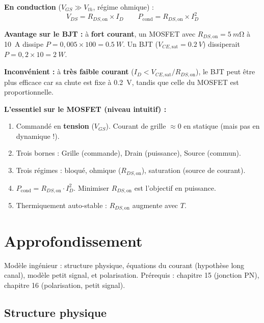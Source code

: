 \documentclass[12pt,a4paper,twoside]{book}
\begin{document}
\begin{formule}
\textbf{En conduction} ($V_{GS} \gg V_{th}$, régime ohmique) :
\[
\boxed{V_{DS} = R_{DS,\text{on}} \times I_D} \qquad \boxed{P_{\text{cond}} = R_{DS,\text{on}} \times I_D^2}
\]

\textbf{Avantage sur le BJT :} à \textbf{fort courant}, un MOSFET avec $R_{DS,\text{on}} = \SI{5}{m\ohm}$ à \SI{10}{A} dissipe $P = 0{,}005\times100 = \SI{0.5}{W}$. Un BJT ($V_{CE,\text{sat}} = \SI{0.2}{V}$) dissiperait $P = 0{,}2\times10 = \SI{2}{W}$.

\textbf{Inconvénient :} à \textbf{très faible courant} ($I_D < V_{CE,\text{sat}}/R_{DS,\text{on}}$), le BJT peut être plus efficace car sa chute est fixe à \SI{0.2}{V}, tandis que celle du MOSFET est proportionnelle.
\end{formule}

\begin{retenir}
\textbf{L'essentiel sur le MOSFET (niveau intuitif) :}
\begin{enumerate}[nosep]
\item Commandé en \textbf{tension} ($V_{GS}$). Courant de grille $\approx 0$ en statique (mais pas en dynamique !).
\item Trois bornes : Grille (commande), Drain (puissance), Source (commun).
\item Trois régimes : bloqué, ohmique ($R_{DS,\text{on}}$), saturation (source de courant).
\item $P_{\text{cond}} = R_{DS,\text{on}} \cdot I_D^2$. Minimiser $R_{DS,\text{on}}$ est l'objectif en puissance.
\item Thermiquement auto-stable : $R_{DS,\text{on}}$ augmente avec $T$.
\end{enumerate}
\end{retenir}

\section{Approfondissement}

\begin{approfondissement}
Modèle ingénieur : structure physique, équations du courant (hypothèse long canal), modèle petit signal, et polarisation. Prérequis : chapitre 15 (jonction PN), chapitre 16 (polarisation, petit signal).
\end{approfondissement}

\subsection{Structure physique}
\end{document}
